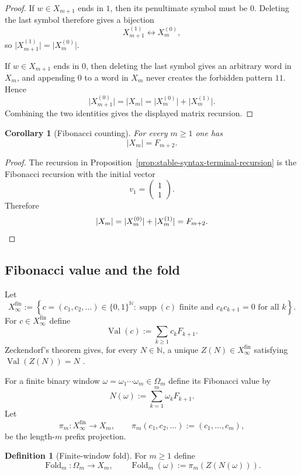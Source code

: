 \documentclass[11pt,letterpaper]{article}
\numberwithin{equation}{section}
\theoremstyle{plain}
\newtheorem{corollary}[theorem]{Corollary}
\theoremstyle{definition}
\newtheorem{definition}[theorem]{Definition}
\theoremstyle{remark}
\newcommand{\NN}{\mathbb{N}}
\newcommand{\Xfin}{X_\infty^{\mathrm{fin}}}
\DeclareMathOperator{\supp}{supp}
\DeclareMathOperator{\Val}{Val}
\DeclareMathOperator{\Fold}{Fold}
\begin{document}
\begin{proof}
If $w\in X_{m+1}$ ends in $1$, then its penultimate symbol must be $0$.
Deleting the last symbol therefore gives a bijection
\[
X_{m+1}^{(1)}\longleftrightarrow X_m^{(0)},
\]
so $\lvert X_{m+1}^{(1)}\rvert=\lvert X_m^{(0)}\rvert$.

If $w\in X_{m+1}$ ends in $0$, then deleting the last symbol gives an
arbitrary word in $X_m$, and appending $0$ to a word in $X_m$ never creates
the forbidden pattern $11$.  Hence
\[
\lvert X_{m+1}^{(0)}\rvert
=
\lvert X_m\rvert
=
\lvert X_m^{(0)}\rvert+\lvert X_m^{(1)}\rvert.
\]
Combining the two identities gives the displayed matrix recursion.
\end{proof}

\begin{corollary}[Fibonacci counting]
\label{cor:stable-syntax-counting}
For every $m\ge 1$ one has
\[
\lvert X_m\rvert=F_{m+2}.
\]
\end{corollary}

\begin{proof}
The recursion in Proposition~\ref{prop:stable-syntax-terminal-recursion} is
the Fibonacci recursion with the initial vector
\[
v_1=
\begin{pmatrix}
1\\[2pt]
1
\end{pmatrix}.
\]
Therefore
\[
\lvert X_m\rvert
=
\lvert X_m^{(0)}\rvert+\lvert X_m^{(1)}\rvert
=
F_{m+2}.
\qedhere
\]
\end{proof}

\subsection{Fibonacci value and the fold}

Let
\[
\Xfin
:=
\left\{
c=(c_1,c_2,\ldots)\in\{0,1\}^{\NN}:
\supp(c)\text{ finite and }c_kc_{k+1}=0\text{ for all }k
\right\}.
\]
For $c\in\Xfin$ define
\[
\Val(c):=\sum_{k\ge 1} c_kF_{k+1}.
\]
Zeckendorf's theorem gives, for every $N\in\NN$, a unique $Z(N)\in \Xfin$
satisfying $\Val(Z(N))=N$ \cite{Zeckendorf1972}.

For a finite binary window $\omega=\omega_1\cdots\omega_m\in\Omega_m$ define
its Fibonacci value by
\[
N(\omega):=\sum_{k=1}^m \omega_kF_{k+1}.
\]
Let
\[
\pi_m:\Xfin\to X_m,
\qquad
\pi_m(c_1,c_2,\ldots):=(c_1,\ldots,c_m),
\]
be the length-$m$ prefix projection.

\begin{definition}[Finite-window fold]
\label{def:fold-word}
For $m\ge 1$ define
\[
\Fold_m:\Omega_m\to X_m,
\qquad
\Fold_m(\omega):=\pi_m(Z(N(\omega))).
\]
\end{definition}
\end{document}
